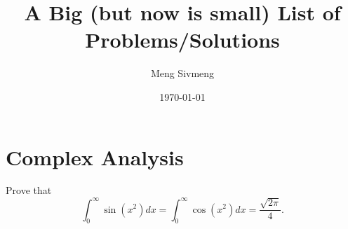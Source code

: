 


\title{A Big (but now is small) List of Problems/Solutions}
\author{Meng Sivmeng}
\date{\today}



\maketitle
\chapter{Complex Analysis}

\begin{problem}[Stien, Ex 1, p. 64]
  Prove that
  \[\int_{0}^{\infty}\sin(x^2)dx=\int_{0}^{\infty}\cos(x^2)dx=\frac{\sqrt{2\pi}}{4}.\]
\end{problem}
